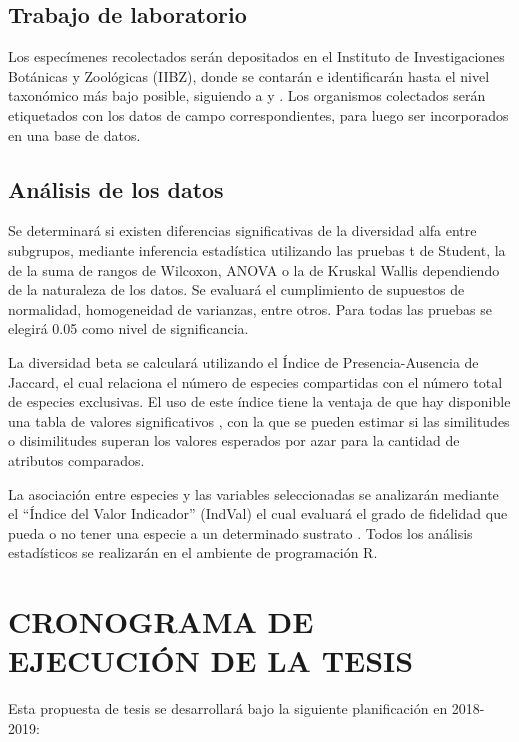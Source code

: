 \documentclass[12pt,letterpaper,spanish]{article}
\begin{document}
\subsection{Trabajo de laboratorio}

Los especímenes recolectados serán depositados en el Instituto de Investigaciones Botánicas y Zoológicas (IIBZ), donde se contarán e identificarán hasta el nivel taxonómico más bajo posible, siguiendo a \citet{needham2000dragonflies} y \citet{westfall1996damselflies}. Los organismos colectados serán  etiquetados con los datos de campo correspondientes, para luego ser incorporados en una base de datos.

\subsection{Análisis de los datos}

Se determinará si existen diferencias significativas de la diversidad alfa entre subgrupos, mediante inferencia estadística utilizando las pruebas t de Student, la de la suma de rangos de Wilcoxon, ANOVA o la de Kruskal Wallis dependiendo de la naturaleza de los datos. Se evaluará el cumplimiento de supuestos de normalidad, homogeneidad de varianzas, entre otros. Para todas las pruebas se elegirá 0.05 como nivel de significancia.

La diversidad beta se calculará utilizando el Índice de Presencia-Ausencia de Jaccard, el cual relaciona el número de especies compartidas con el número total de especies exclusivas. El uso de este índice tiene la ventaja de que hay disponible una tabla de valores significativos \citep{real1999tables}, con la que se pueden estimar si las similitudes o disimilitudes superan los valores esperados por azar para la cantidad de atributos comparados.

La asociación entre especies y las variables seleccionadas se analizarán mediante el “Índice del Valor Indicador” (IndVal) el cual evaluará el grado de fidelidad que pueda o no tener una especie a un determinado sustrato \citep{caceres2009associations}. Todos los análisis estadísticos se realizarán en el ambiente de programación R. 

\newpage
\section*{CRONOGRAMA DE EJECUCIÓN DE LA TESIS}
\vspace*{1.0cm}
Esta propuesta de tesis se desarrollará bajo la siguiente planificación en 2018-2019:
\\
\end{document}
